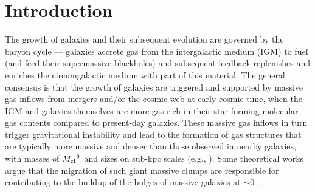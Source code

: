 \documentclass[iop]{emulateapj}
\begin{document}


\def\figpath{./Fig}

\section{Introduction}    \label{sec:intro}

The growth of galaxies and their subsequent evolution are governed by the baryon cycle ---
galaxies accrete gas from the intergalactic medium (IGM) to fuel \SF (and feed their supermassive blackholes)
and subsequent feedback replenishes and enriches the circumgalactic medium with part of this material.
The general consensus is that the growth of \highz galaxies are triggered and supported by massive
gas inflows from mergers and/or the cosmic web at early cosmic time, when the IGM and galaxies themselves 
are more gas-rich in their star-forming molecular
gas contents compared to present-day galaxies.
These massive gas inflows in turn trigger gravitational instability and lead
to the formation of gas structures that are typically more massive and denser than those
observed in nearby galaxies, with masses of $M_{\rm cl}$$^9$\,\Msun
and sizes on sub-kpc scales (e.g., \citealt{Gabor13a, Hopkins14a, Inoue16a}).
Some theoretical works argue that the
migration of such giant massive clumps are responsible for contributing to the
buildup of the bulges of massive galaxies at \z$\sim$0 \citep[e.g.,][]{Ceverino10a}.
\end{document}
